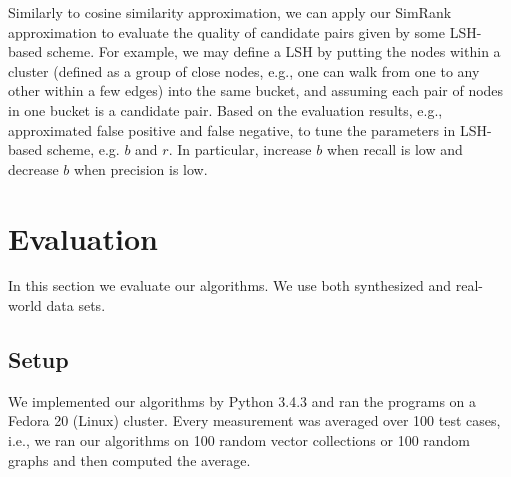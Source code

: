 \documentclass{article}
\begin{document}
{\color{black}
Similarly to cosine similarity approximation, we can apply our SimRank approximation to evaluate the quality of candidate pairs given by some LSH-based scheme. For example, we may define a LSH by putting the nodes within a cluster (defined as a group of close nodes, e.g., one can walk from one to any other within a few edges) into the same bucket, and assuming each pair of nodes in one bucket is a candidate pair. Based on the evaluation results, e.g., approximated false positive and false negative, to tune the parameters in LSH-based scheme, e.g. $b$ and $r$. In particular, increase $b$ when recall is low and decrease $b$ when precision is low.
}

\section{Evaluation}
\label{sec:eval}
In this section we evaluate our algorithms. We use both synthesized and real-world data sets.

\subsection{Setup}
We implemented our algorithms by Python 3.4.3 and ran the programs on a Fedora 20 (Linux) cluster. Every measurement was averaged over 100 test cases, i.e., we ran our algorithms on 100 random vector collections or 100 random graphs and then computed the average.
\end{document}
